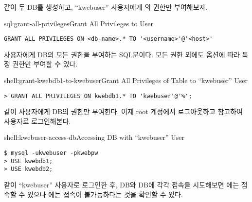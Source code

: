 \와 같이 두 DB를 생성하고, ``kwebuser'' 사용자에게 의 권한만 부여해보자.

\begin{sqlenv}{sql:grant-all-privileges}{Grant All Privileges to User}\begin{verbatim}
GRANT ALL PRIVILEGES ON <db-name>.* TO '<username>'@'<host>'
\end{verbatim}
\end{sqlenv}

\는 사용자에게  DB의 모든 권한을 부여하는 SQL문이다. 모든 권한 외에도 옵션에 따라 특정 권한만 부여할 수 있다.

\begin{shellenv}{shell:grant-kwebdb1-to-kwebuser}{Grant All Privileges of  Table to ``kwebuser'' User}\begin{verbatim}
> GRANT ALL PRIVILEGES ON kwebdb1.* TO 'kwebuser'@'%';
\end{verbatim}
\end{shellenv}

\와 같이  사용자에게  DB의 권한만 부여한다. 이제 root 계정에서 로그아웃하고 \을 참고하여  사용자로 로그인해본다.

\begin{shellenv}{shell:kwebuser-access-db}{Accessing DB with ``kwebuser'' User}\begin{verbatim}
$ mysql -ukwebuser -pkwebpw
> USE kwebdb1;
> USE kwebdb2;
\end{verbatim}
\end{shellenv}

\와 같이 ``kwebuser'' 사용자로 로그인한 후,  DB와  DB에 각각 접속을 시도해보면 에는 접속할 수 있으나 에는 접속이 불가능하다는 것을 확인할 수 있다.
